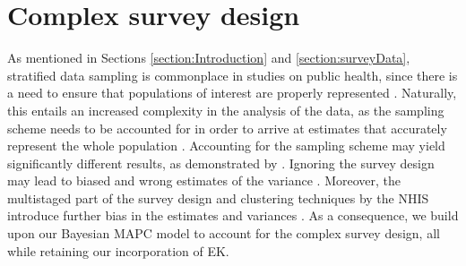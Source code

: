 \section{Complex survey design}
\label{section:application2}
As mentioned in Sections \ref{section:Introduction} and \ref{section:surveyData}, stratified data sampling is commonplace in studies on public health, since there is a need to ensure that populations of interest are properly represented \citep{lehtonen2004practical}. Naturally, this entails an increased complexity in the analysis of the data, as the sampling scheme needs to be accounted for in order to arrive at estimates that accurately represent the whole population \citep{skinner2017introduction}. Accounting for the sampling scheme may yield significantly different results, as demonstrated by \cite{SurveyDesignMercer}. Ignoring the survey design may lead to biased and wrong estimates of the variance \citep{kaombe2023impact}. Moreover, the multistaged part of the survey design and clustering techniques by the NHIS introduce further bias in the estimates and variances \citep{roberts2000pitfalls}. As a consequence, we build upon our Bayesian MAPC model to account for the complex survey design, all while retaining our incorporation of EK. 

